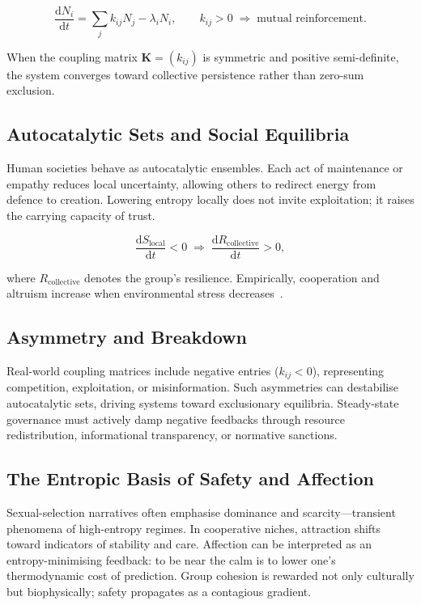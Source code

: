 \documentclass[12pt,a4paper]{article}
\theoremstyle{definition}
\newcommand{\ddt}[1]{\frac{\mathrm{d}#1}{\mathrm{d}t}}
\begin{document}
\begin{equation}
  \ddt{N_i} = \sum_j k_{ij} N_j - \lambda_i N_i,
  \qquad k_{ij} > 0 \;\Longrightarrow\; \text{mutual reinforcement.}
  \label{eq:autocatalysis}
\end{equation}

When the coupling matrix $\mathbf{K} = (k_{ij})$ is symmetric and positive
semi-definite, the system converges toward collective persistence rather than
zero-sum exclusion.

\subsection{Autocatalytic Sets and Social Equilibria}

Human societies behave as autocatalytic ensembles.  Each act of maintenance
or empathy reduces local uncertainty, allowing others to redirect energy from
defence to creation.  Lowering entropy locally does not invite exploitation;
it raises the carrying capacity of trust.

\begin{equation}
  \ddt{S_{\mathrm{local}}} < 0
  \;\Longrightarrow\;
  \ddt{R_{\mathrm{collective}}} > 0,
\end{equation}

where $R_{\mathrm{collective}}$ denotes the group's resilience.  Empirically,
cooperation and altruism increase when environmental stress
decreases~\citep{bernhard2021}.

\subsection{Asymmetry and Breakdown}

Real-world coupling matrices include negative entries ($k_{ij} < 0$),
representing competition, exploitation, or misinformation.  Such asymmetries
can destabilise autocatalytic sets, driving systems toward exclusionary
equilibria.  Steady-state governance must actively damp negative feedbacks
through resource redistribution, informational transparency, or normative
sanctions.

\subsection{The Entropic Basis of Safety and Affection}

Sexual-selection narratives often emphasise dominance and scarcity---transient
phenomena of high-entropy regimes.  In cooperative niches, attraction shifts
toward indicators of stability and care.  Affection can be interpreted as an
entropy-minimising feedback: to be near the calm is to lower one's
thermodynamic cost of prediction.  Group cohesion is rewarded not only
culturally but biophysically; safety propagates as a contagious gradient.
\end{document}
